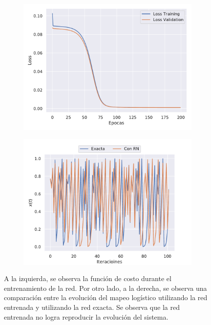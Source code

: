 \begin{figure}[h!]
    \centering
    \begin{subfigure}[h]{0.49\textwidth} 
        \includegraphics[width=\textwidth]{Figuras/ej3/Largo_Loss.pdf}
    \end{subfigure}       
    \begin{subfigure}[h]{0.49\textwidth} 
        \includegraphics[width=\textwidth]{Figuras/ej3/Largo_Evolucion.pdf}
    \end{subfigure}
    \caption{A la izquierda, se observa la función de costo durante el entrenamiento de la red. Por otro lado, a la derecha, se observa una comparación entre la evolución del mapeo logístico utilizando la red entrenada y utilizando la red exacta. Se observa que la red entrenada no logra reproducir la evolución del sistema.} \label{fig:3_Resultados_Largo}
\end{figure}

